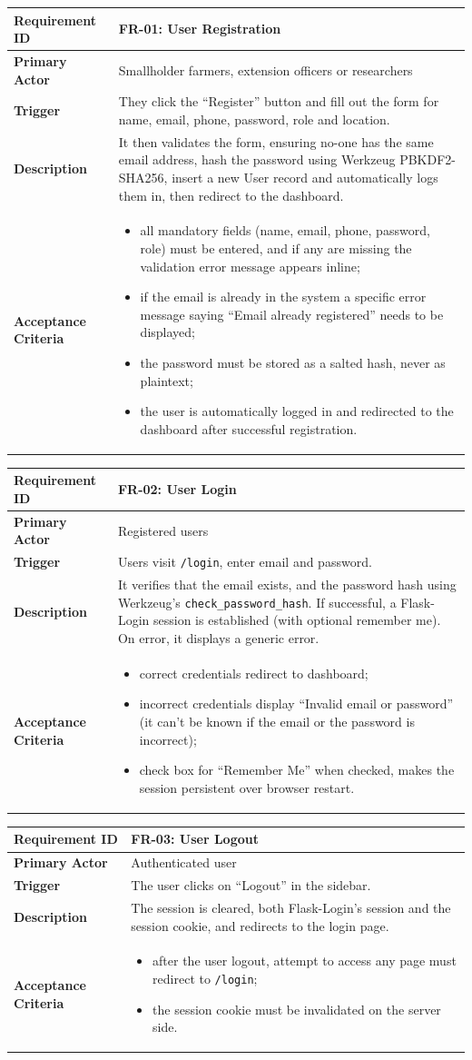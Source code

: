 \documentclass[12pt,a4paper]{article}
\newcommand{\frbox}[5]{%
  \begin{table}[H]
  \centering
  \begin{tabularx}{\textwidth}{|l|X|}
  \hline
  \rowcolor{lightgreen}
  \textbf{Requirement ID} & \textbf{#1} \\
  \hline
  \textbf{Primary Actor} & #2 \\
  \hline
  \textbf{Trigger} & #3 \\
  \hline
  \textbf{Description} & #4 \\
  \hline
  \rowcolor{lightgreen}
  \textbf{Acceptance Criteria} & #5 \\
  \hline
  \end{tabularx}
  \end{table}
}
\begin{document}
\frbox{FR-01: User Registration}
{Smallholder farmers, extension officers or researchers}
{They click the ``Register'' button and fill out the form for name, email, phone, password, role and location.}
{It then validates the form, ensuring no-one has the same email address, hash the password using Werkzeug PBKDF2-SHA256, insert a new User record and automatically logs them in, then redirect to the dashboard.}
{%
\begin{itemize}[leftmargin=1.5em]
  \item all mandatory fields (name, email, phone, password, role) must be entered, and if any are missing the validation error message appears inline;
  \item if the email is already in the system a specific error message saying ``Email already registered'' needs to be displayed;
  \item the password must be stored as a salted hash, never as plaintext;
  \item the user is automatically logged in and redirected to the dashboard after successful registration.
\end{itemize}
}

\frbox{FR-02: User Login}
{Registered users}
{Users visit \texttt{/login}, enter email and password.}
{It verifies that the email exists, and the password hash using Werkzeug's \texttt{check\_password\_hash}. If successful, a Flask-Login session is established (with optional remember me). On error, it displays a generic error.}
{%
\begin{itemize}[leftmargin=1.5em]
  \item correct credentials redirect to dashboard;
  \item incorrect credentials display ``Invalid email or password'' (it can't be known if the email or the password is incorrect);
  \item check box for ``Remember Me'' when checked, makes the session persistent over browser restart.
\end{itemize}
}

\frbox{FR-03: User Logout}
{Authenticated user}
{The user clicks on ``Logout'' in the sidebar.}
{The session is cleared, both Flask-Login's session and the session cookie, and redirects to the login page.}
{%
\begin{itemize}[leftmargin=1.5em]
  \item after the user logout, attempt to access any page must redirect to \texttt{/login};
  \item the session cookie must be invalidated on the server side.
\end{itemize}
}
\end{document}
